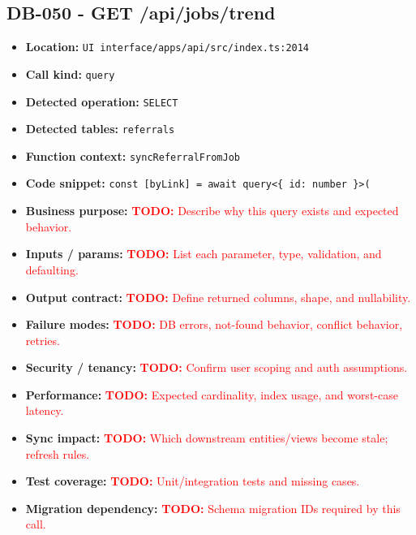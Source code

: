 \documentclass[11pt]{article}
\newcommand{\todoitem}[1]{\textcolor{red}{\textbf{TODO:} #1}}
\begin{document}
\subsection{DB-050 - GET /api/jobs/trend}
\begin{itemize}[leftmargin=1.5em]
\item \textbf{Location:} \texttt{UI interface/apps/api/src/index.ts:2014}
\item \textbf{Call kind:} \texttt{query}
\item \textbf{Detected operation:} \texttt{SELECT}
\item \textbf{Detected tables:} \texttt{referrals}
\item \textbf{Function context:} \texttt{syncReferralFromJob}
\item \textbf{Code snippet:} \texttt{const [byLink] = await query<\{ id: number \}>(}
\item \textbf{Business purpose:} \todoitem{Describe why this query exists and expected behavior.}
\item \textbf{Inputs / params:} \todoitem{List each parameter, type, validation, and defaulting.}
\item \textbf{Output contract:} \todoitem{Define returned columns, shape, and nullability.}
\item \textbf{Failure modes:} \todoitem{DB errors, not-found behavior, conflict behavior, retries.}
\item \textbf{Security / tenancy:} \todoitem{Confirm user scoping and auth assumptions.}
\item \textbf{Performance:} \todoitem{Expected cardinality, index usage, and worst-case latency.}
\item \textbf{Sync impact:} \todoitem{Which downstream entities/views become stale; refresh rules.}
\item \textbf{Test coverage:} \todoitem{Unit/integration tests and missing cases.}
\item \textbf{Migration dependency:} \todoitem{Schema migration IDs required by this call.}
\end{itemize}
\end{document}
